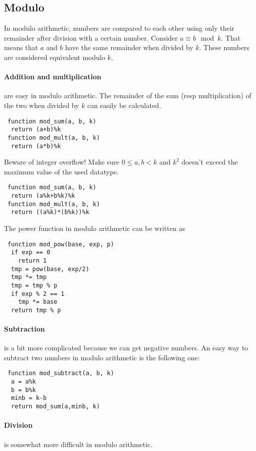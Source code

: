 \subsection{Modulo}
In modulo arithmetic, numbers are compared to each other using only their remainder after division with a certain number.
Consider $a \equiv b \mod{k}$. That means that $a$ and $b$ have the same remainder when divided by $k$. These numbers are considered equivalent modulo $k$.

\paragraph{Addition and multiplication} are easy in modulo arithmetic. The remainder of the sum (resp multiplication) of the two when divided by $k$ can easily be calculated.

\begin{lstlisting}
 function mod_sum(a, b, k)
  return (a+b)%k
 function mod_mult(a, b, k)
  return (a*b)%k
\end{lstlisting}

Beware of integer overflow! Make sure $0 \leq a, b < k$ and $k^2$ doesn't exceed the maximum value of the used datatype.

\begin{lstlisting}
 function mod_sum(a, b, k)
  return (a%k+b%k)%k
 function mod_mult(a, b, k)
  return ((a%k)*(b%k))%k
\end{lstlisting}

The power function in modulo arithmetic can be written as
\begin{lstlisting}
 function mod_pow(base, exp, p)
  if exp == 0
    return 1
  tmp = pow(base, exp/2)
  tmp *= tmp
  tmp = tmp % p
  if exp % 2 == 1
    tmp *= base
  return tmp % p
\end{lstlisting}

\paragraph{Subtraction} is a bit more complicated because we can get negative numbers.
An easy way to subtract two numbers in modulo arithmetic is the following one:
\begin{lstlisting}
 function mod_subtract(a, b, k)
  a = a%k
  b = b%k
  minb = k-b
  return mod_sum(a,minb, k)
\end{lstlisting}

\paragraph{Division} is somewhat more difficult in modulo arithmetic. 

